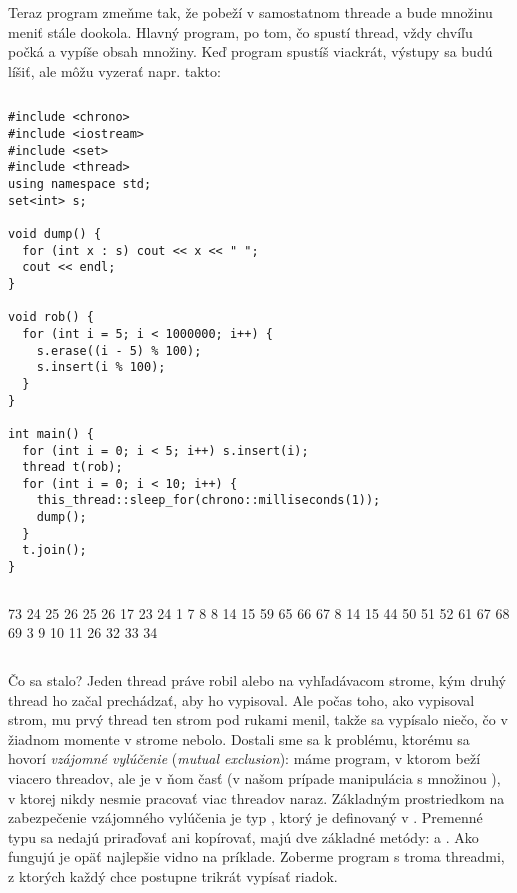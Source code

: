 Teraz program zmeňme tak, že  pobeží v samostatnom threade a bude množinu meniť stále dookola. Hlavný program, po tom, čo spustí thread, vždy chvíľu počká
a vypíše obsah množiny. Keď program spustíš viackrát, výstupy sa budú líšiť, ale môžu vyzerať napr. takto:


\begin{column}{0.6}
\begin{lstlisting}
#include <chrono>
#include <iostream>
#include <set>
#include <thread>
using namespace std;
set<int> s;

void dump() {
  for (int x : s) cout << x << " ";
  cout << endl;
}

void rob() {
  for (int i = 5; i < 1000000; i++) {
    s.erase((i - 5) % 100);
    s.insert(i % 100);
  }
}

int main() {
  for (int i = 0; i < 5; i++) s.insert(i);
  thread t(rob);
  for (int i = 0; i < 10; i++) {
    this_thread::sleep_for(chrono::milliseconds(1));
    dump();
  }
  t.join();
}
\end{lstlisting}
  \end{column}
  \hfill
  \begin{column}{0.3}
\begin{outputBox}
73 24 25 26 25 26 
17 23 24 
1 7 8 
8 14 15 
59 65 66 67 
8 14 15 
44 50 51 52 
61 67 68 69 
3 9 10 11 
26 32 33 34 
\end{outputBox}
  \end{column}

Čo sa stalo? Jeden thread práve robil  alebo  na vyhľadávacom strome, 
kým druhý thread ho začal prechádzať, aby ho vypisoval. Ale počas toho, ako vypisoval strom, mu prvý thread
ten strom pod rukami menil, takže sa vypísalo niečo, čo v žiadnom momente v strome nebolo. Dostali sme sa k problému, ktorému sa hovorí
 {\em vzájomné vylúčenie} ({\em mutual exclusion}):
máme program, v ktorom beží viacero threadov, ale je v  ňom časť (v našom prípade manipulácia s množinou ), v ktorej nikdy nesmie pracovať viac threadov naraz. Základným
prostriedkom na zabezpečenie
vzájomného vylúčenia je typ , ktorý je definovaný v . Premenné typu  sa nedajú priraďovať ani kopírovať, majú dve základné metódy:  a .
Ako fungujú je opäť najlepšie vidno na príklade. Zoberme program s troma threadmi, z ktorých každý chce postupne trikrát vypísať riadok. \\

